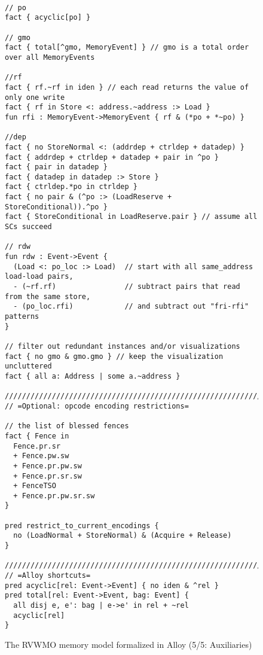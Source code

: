 \begin{figure}[h!]
  {
  \tt\bfseries\centering\footnotesize
  \begin{lstlisting}
// po
fact { acyclic[po] }

// gmo
fact { total[^gmo, MemoryEvent] } // gmo is a total order over all MemoryEvents

//rf
fact { rf.~rf in iden } // each read returns the value of only one write
fact { rf in Store <: address.~address :> Load }
fun rfi : MemoryEvent->MemoryEvent { rf & (*po + *~po) }

//dep
fact { no StoreNormal <: (addrdep + ctrldep + datadep) }
fact { addrdep + ctrldep + datadep + pair in ^po }
fact { pair in datadep }
fact { datadep in datadep :> Store }
fact { ctrldep.*po in ctrldep }
fact { no pair & (^po :> (LoadReserve + StoreConditional)).^po }
fact { StoreConditional in LoadReserve.pair } // assume all SCs succeed

// rdw
fun rdw : Event->Event {
  (Load <: po_loc :> Load)  // start with all same_address load-load pairs,
  - (~rf.rf)                // subtract pairs that read from the same store,
  - (po_loc.rfi)            // and subtract out "fri-rfi" patterns
}

// filter out redundant instances and/or visualizations
fact { no gmo & gmo.gmo } // keep the visualization uncluttered
fact { all a: Address | some a.~address }

////////////////////////////////////////////////////////////////////////////////
// =Optional: opcode encoding restrictions=

// the list of blessed fences
fact { Fence in
  Fence.pr.sr
  + Fence.pw.sw
  + Fence.pr.pw.sw
  + Fence.pr.sr.sw
  + FenceTSO
  + Fence.pr.pw.sr.sw
}

pred restrict_to_current_encodings {
  no (LoadNormal + StoreNormal) & (Acquire + Release)
}

////////////////////////////////////////////////////////////////////////////////
// =Alloy shortcuts=
pred acyclic[rel: Event->Event] { no iden & ^rel }
pred total[rel: Event->Event, bag: Event] {
  all disj e, e': bag | e->e' in rel + ~rel
  acyclic[rel]
}
\end{lstlisting}}
  \caption{The RVWMO memory model formalized in Alloy (5/5: Auxiliaries)}
  \label{fig:alloy5}
\end{figure}

